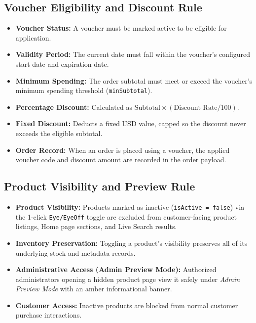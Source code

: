 \documentclass[12pt,a4paper,oneside]{report}
\begin{document}
\subsection{Voucher Eligibility and Discount Rule}
\begin{itemize}[leftmargin=1.2cm]
    \item \textbf{Voucher Status:} A voucher must be marked active to be eligible for application.
    \item \textbf{Validity Period:} The current date must fall within the voucher's configured start date and expiration date.
    \item \textbf{Minimum Spending:} The order subtotal must meet or exceed the voucher's minimum spending threshold (\texttt{minSubtotal}).
    \item \textbf{Percentage Discount:} Calculated as $\text{Subtotal} \times (\text{Discount Rate} / 100)$.
    \item \textbf{Fixed Discount:} Deducts a fixed USD value, capped so the discount never exceeds the eligible subtotal.
    \item \textbf{Order Record:} When an order is placed using a voucher, the applied voucher code and discount amount are recorded in the order payload.
\end{itemize}

\subsection{Product Visibility and Preview Rule}
\begin{itemize}[leftmargin=1.2cm]
    \item \textbf{Product Visibility:} Products marked as inactive (\texttt{isActive = false}) via the 1-click \texttt{Eye/EyeOff} toggle are excluded from customer-facing product listings, Home page sections, and Live Search results.
    \item \textbf{Inventory Preservation:} Toggling a product's visibility preserves all of its underlying stock and metadata records.
    \item \textbf{Administrative Access (Admin Preview Mode):} Authorized administrators opening a hidden product page view it safely under \textit{Admin Preview Mode} with an amber informational banner.
    \item \textbf{Customer Access:} Inactive products are blocked from normal customer purchase interactions.
\end{itemize}
\end{document}
